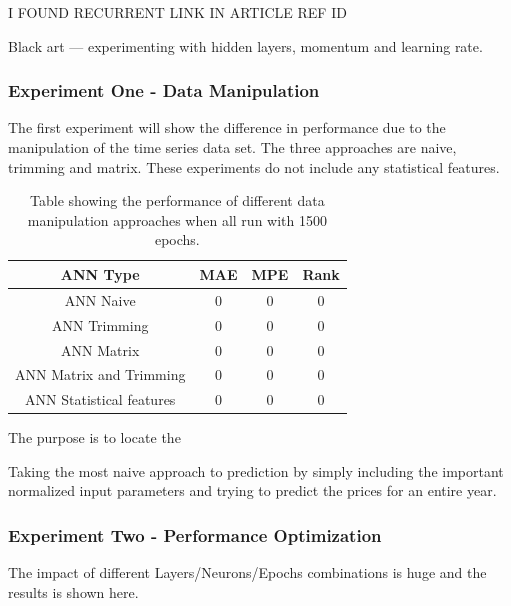 I FOUND RECURRENT LINK IN ARTICLE REF ID

Black art --- experimenting with hidden layers, momentum and learning rate. 


\subsubsection{Experiment One - Data Manipulation}
The first experiment will show the difference in performance due to the manipulation of the time series data set. The three approaches are naive, trimming and matrix. These experiments do not include any statistical features.

\begin{table}[H]
\centering  %
\begin{tabular}{c c c c} %
ANN Type & MAE & MPE & Rank \\ [0.5ex] %
\hline                  %
ANN Naive & 0 & 0 & 0 \\ %
ANN Trimming & 0 & 0 & 0 \\
ANN Matrix  & 0 & 0 & 0\\
ANN Matrix and Trimming  & 0 & 0 & 0 \\ 
ANN Statistical features  & 0 & 0 & 0\\ [1ex] %
\hline %
\end{tabular}
\caption{Table showing the performance of different data manipulation approaches when all run with 1500 epochs.} %
\label{table:dataManipulationApproaches} %
\end{table}

The purpose is to locate the 


Taking the most naive approach to prediction by simply including the important normalized input parameters and trying to predict the prices for an entire year. 

\subsubsection{Experiment Two - Performance Optimization}
The impact of different Layers/Neurons/Epochs combinations is huge and the results is shown here.

